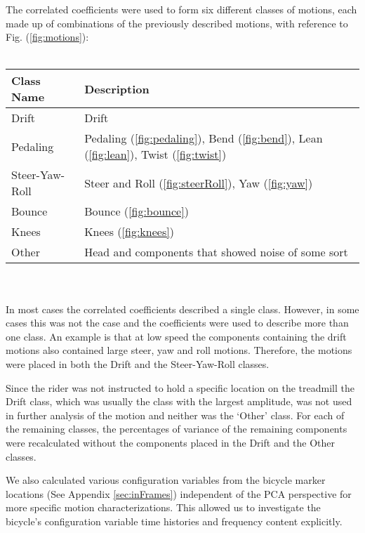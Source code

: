 \documentclass[smallextended]{svjour3}     %
\begin{document}
The correlated coefficients were used to form six different classes of motions,
each made up of combinations of the previously described motions, with
reference to Fig. (\ref{fig:motions}):\\
\\
\begin{tabular}[]{ll}
    Class Name & Description\\
    \hline
    Drift & Drift\\
    Pedaling & Pedaling (\ref{fig:pedaling}), Bend (\ref{fig:bend}), Lean
        (\ref{fig:lean}), Twist (\ref{fig:twist})\\
    Steer-Yaw-Roll & Steer and Roll (\ref{fig:steerRoll}), Yaw
        (\ref{fig:yaw})\\
    Bounce & Bounce (\ref{fig:bounce})\\
    Knees & Knees (\ref{fig:knees})\\
    Other & Head and components that showed noise of some
    sort
\end{tabular}\\
\\
In most cases the correlated coefficients described a single class. However, in
some cases this was not the case and the coefficients were used to describe
more than one class. An example is that at low speed the components containing
the drift motions also contained large steer, yaw and roll motions. Therefore,
the motions were placed in both the Drift and the Steer-Yaw-Roll classes.

Since the rider was not instructed to hold a specific location on the treadmill
the Drift class, which was usually the class with the largest amplitude, was
not used in further analysis of the motion and neither was the `Other' class.
For each of the remaining classes, the percentages of variance of the remaining
components were recalculated without the components placed in the Drift and the
Other classes.

We also calculated various configuration variables from the bicycle marker locations
(See Appendix \ref{sec:inFrames}) independent of the PCA perspective for more
specific motion characterizations. This allowed us to investigate the bicycle's
configuration variable time histories and frequency content explicitly.
\end{document}
